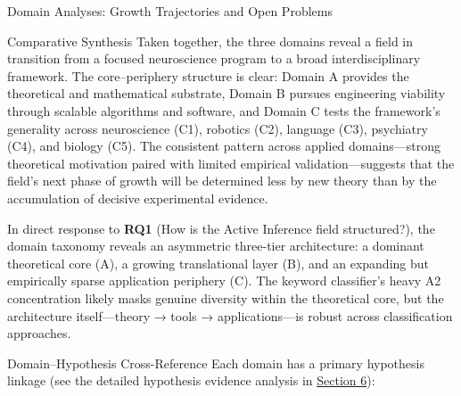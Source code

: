 \documentclass[
  ignorenonframetext,
]{beamer}
\begin{document}
\begin{frame}{Domain Analyses: Growth Trajectories and Open Problems
\label{sec:subfield_analyses}}
\begin{block}{Comparative Synthesis}
\protect{}\label{comparative-synthesis}
Taken together, the three domains reveal a field in transition from a
focused neuroscience program to a broad interdisciplinary framework. The
core--periphery structure is clear: Domain A provides the theoretical
and mathematical substrate, Domain B pursues engineering viability
through scalable algorithms and software, and Domain C tests the
framework's generality across neuroscience (C1), robotics (C2), language
(C3), psychiatry (C4), and biology (C5). The consistent pattern across
applied domains---strong theoretical motivation paired with limited
empirical validation---suggests that the field's next phase of growth
will be determined less by new theory than by the accumulation of
decisive experimental evidence.

In direct response to \textbf{RQ1} (How is the Active Inference field
structured?), the domain taxonomy reveals an asymmetric three-tier
architecture: a dominant theoretical core (A), a growing translational
layer (B), and an expanding but empirically sparse application periphery
(C). The keyword classifier's heavy A2 concentration likely masks
genuine diversity within the theoretical core, but the architecture
itself---theory → tools → applications---is robust across classification
approaches.

\begin{block}{Domain--Hypothesis Cross-Reference}
\protect{}\label{domainhypothesis-cross-reference}
Each domain has a primary hypothesis linkage (see the detailed
hypothesis evidence analysis in
\hyperref[sec:hypothesis_results]{Section 6}):


\end{block}
\end{block}
\end{frame}
\end{document}
